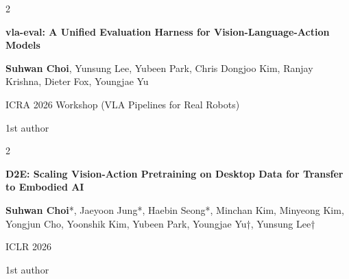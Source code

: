 \documentclass[10pt, letterpaper]{article}
\newenvironment{pubentry}[2][]{
    \onecolentry
    \def\secondColumn{#2}
    \setcolumnwidth{\fill, 2 cm}
    \begin{paracol}{2}
}{
    \switchcolumn \raggedleft \secondColumn
    \end{paracol}
    \endonecolentry
} %
\let\hrefWithoutArrow\href
\renewcommand{\href}[2]{\hrefWithoutArrow{#1}{\ifthenelse{\equal{#2}{}}{ }{#2 }\raisebox{.15ex}{\footnotesize \faExternalLink*}}}
\begin{document}
\vspace{0.2 cm}

%
%
%
%


\begin{samepage}
    \begin{pubentry}{
            1st author
        }
        \textbf{vla-eval: A Unified Evaluation Harness for Vision-Language-Action Models}

        \vspace{0.10 cm}

        \small \textbf{Suhwan Choi}, Yunsung Lee, Yubeen Park, Chris Dongjoo Kim, Ranjay Krishna, Dieter Fox, Youngjae Yu

        \vspace{0.10 cm}

        ICRA 2026 Workshop (VLA Pipelines for Real Robots) \href{https://github.com/allenai/vla-evaluation-harness}{[Code]} \href{https://icra2026vlapipeline.github.io/}{[Workshop]}
    \end{pubentry}
\end{samepage}

\vspace{0.2 cm}

\begin{samepage}
    \begin{pubentry}{
            1st author
        }
        \textbf{D2E: Scaling Vision-Action Pretraining on Desktop Data for Transfer to Embodied AI}

        \vspace{0.10 cm}

        \small \textbf{Suhwan Choi}*, Jaeyoon Jung*, Haebin Seong*, Minchan Kim, Minyeong Kim, Yongjun Cho, Yoonshik Kim, Yubeen Park, Youngjae Yu†, Yunsung Lee†

        \vspace{0.10 cm}

        ICLR 2026 \href{https://worv-ai.github.io/d2e/}{[Website]}
    \end{pubentry}
\end{samepage}
\end{document}
